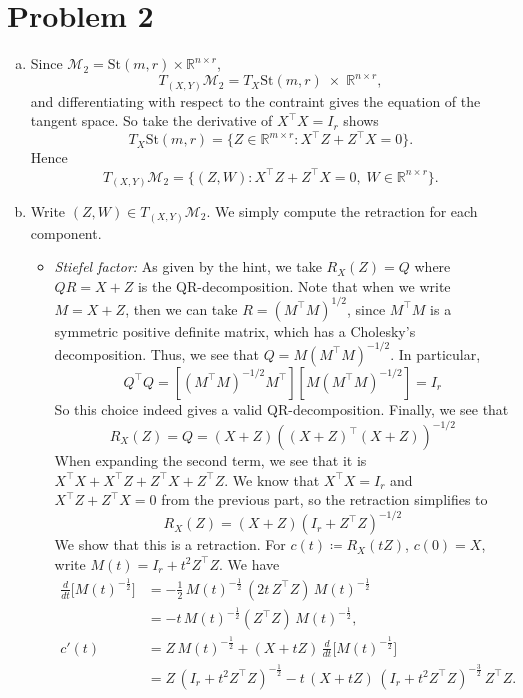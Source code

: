 \documentclass[11pt]{scrartcl}
\newcommand{\St}{\mathrm{St}}
\newcommand{\M}{\mathcal{M}}
\newcommand{\R}{\mathbb{R}}
\begin{document}
\newpage

\section{Problem 2}

\begin{enumerate}[(a)]
    \item Since \(\M_2 = \St(m,r)\times\R^{n\times r}\),  
    \[
    T_{(X,Y)}\M_2
      = T_X\St(m,r)\;\times\;\R^{n\times r},
    \]
    and differentiating with respect to the contraint gives the equation of the tangent space. So take the derivative of \(X^{\top}X=I_r\) shows
    \[
    T_X\St(m,r)
      = \bigl\{Z\in\R^{m\times r}: X^{\top}Z + Z^{\top}X = 0 \bigr\}.
    \]
    Hence
    \[
    T_{(X,Y)}\M_2
      = \bigl\{(Z,W)\!: X^{\top}Z + Z^{\top}X = 0,\; W\in\R^{n\times r}\bigr\}.
    \]
    \item Write \((Z,W)\in T_{(X,Y)}\M_2\). We simply compute the retraction for each component.  
    \begin{itemize}
        \item \emph{Stiefel factor:} As given by the hint, we take $R_X(Z) = Q$ where $QR=X+Z$ is the QR-decomposition. Note that when we write $M = X+Z$, then we can take $R = (M^\top M)^{1/2}$, since $M^\top M$ is a symmetric positive definite matrix, which has a Cholesky's decomposition. Thus, we see that $Q = M (M^\top M)^{-1/2}$. In particular, \[Q^\top Q = [(M^\top M)^{-1/2} M^\top][M (M^\top M)^{-1/2}] = I_r\]
        So this choice indeed gives a valid QR-decomposition. Finally, we see that \[R_X(Z) = Q = (X+Z)((X+Z)^\top(X+Z))^{-1/2}\]
        When expanding the second term, we see that it is $X^\top X + X^\top Z + Z^\top X + Z^\top Z$. We know that $X^\top X = I_r$ and $ X^\top Z + Z^\top X = 0$ from the previous part, so the retraction simplifies to \[R_X(Z) = (X+Z)(I_r + Z^\top Z)^{-1/2}\]
        We show that this is a retraction. For $c(t) \coloneq R_X(tZ)$, $c(0) = X$, write $M(t)=I_r + t^2 Z^\top Z$. We have \begin{align*}
            \frac{d}{dt}\bigl[M(t)^{-\tfrac12}\bigr]
            &=-\tfrac12\,M(t)^{-\tfrac12}\,(2t\,Z^\top Z)\,M(t)^{-\tfrac12} \\
            &=-t\,M(t)^{-\tfrac12}(Z^\top Z)\,M(t)^{-\tfrac12},\\
            c'(t)
            &=Z\,M(t)^{-\tfrac12}
            +(X + tZ)\,\frac{d}{dt}\bigl[M(t)^{-\tfrac12}\bigr]\\
            &=Z\,(I_r + t^2 Z^\top Z)^{-\tfrac12}
            -t\,(X + tZ)\,(I_r + t^2 Z^\top Z)^{-\tfrac32}\,Z^\top Z.

\end{align*}
\end{itemize}
\end{enumerate}
\end{document}
